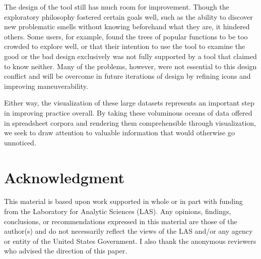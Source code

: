 \documentclass[conference]{IEEEtran}
\begin{document}
	The design of the tool still has much room for improvement. Though the
	exploratory philosophy fostered certain goals well, such as the ability to
	discover new problematic smells without knowing beforehand what they are, it
	hindered others. Some users, for example, found the trees of popular functions
	to be too crowded to explore well, or that their intention to use the tool to
	examine the good or the bad design exclusively was not fully supported by a
	tool that claimed to know neither. Many of the problems, however, were not
	essential to this design conflict and will be overcome in future iterations of
	design by refining icons and improving maneuverability. \par
	
	Either way, the visualization of these large datasets represents an important
	step in improving practice overall. By taking these voluminous oceans of data
	offered in spreadsheet corpora and rendering them comprehensible through
	visualization, we seek to draw attention to valuable information that would
	otherwise go unnoticed.
	
	\section*{Acknowledgment}
	
	This material is based upon work supported in whole or in part with funding
	from the Laboratory for Analytic Sciences (LAS). Any opinions, findings,
	conclusions, or recommendations expressed in this material are those of the
	author(s) and do not necessarily reflect the views of the LAS and/or any agency
	or entity of the United States Government. I also thank the anonymous reviewers
	who advised the direction of this paper.
	
	
	
	
	
	
\end{document}
